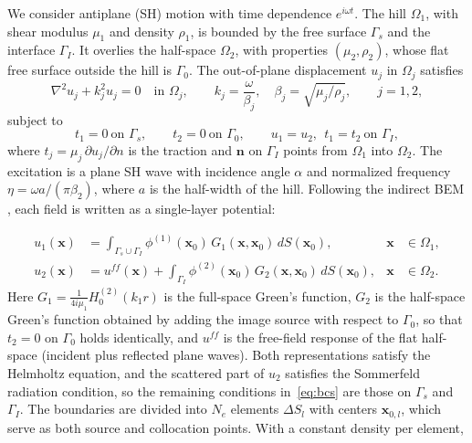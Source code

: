 \documentclass[11pt,twoside]{article}
\begin{document}
We consider antiplane (SH) motion with time dependence $e^{i\omega t}$. The hill
$\Omega_1$, with shear modulus $\mu_1$ and density $\rho_1$, is bounded by the free
surface $\Gamma_s$ and the interface $\Gamma_I$. It overlies the half-space
$\Omega_2$, with properties $(\mu_2,\rho_2)$, whose flat free surface outside the
hill is $\Gamma_0$. The out-of-plane displacement $u_j$ in $\Omega_j$ satisfies
\begin{equation}
  \nabla^2 u_j + k_j^2 u_j = 0 \quad \text{in } \Omega_j,
  \qquad k_j = \frac{\omega}{\beta_j},\quad \beta_j = \sqrt{\mu_j/\rho_j},
  \qquad j = 1,2,
\end{equation}
subject to
\begin{equation}\label{eq:bcs}
  t_1 = 0 \ \text{on } \Gamma_s, \qquad
  t_2 = 0 \ \text{on } \Gamma_0, \qquad
  u_1 = u_2,\ \ t_1 = t_2 \ \text{on } \Gamma_I,
\end{equation}
where $t_j = \mu_j\,\partial u_j/\partial n$ is the traction and $\mathbf{n}$ on
$\Gamma_I$ points from $\Omega_1$ into $\Omega_2$. The excitation is a plane SH
wave with incidence angle $\alpha$ and normalized frequency
$\eta = \omega a/(\pi\beta_2)$, where $a$ is the half-width of the hill. Following the indirect BEM \citep{SanchezSesma1991,wu_novel_2026}, each field
is written as a single-layer potential:

\begin{align}
  u_1(\mathbf{x}) &= \int_{\Gamma_s\cup\Gamma_I}
     \phi^{(1)}(\mathbf{x}_0)\, G_1(\mathbf{x},\mathbf{x}_0)\, dS(\mathbf{x}_0),
     & \mathbf{x}&\in\Omega_1, \label{eq:u1}\\
  u_2(\mathbf{x}) &= u^{f\!f}(\mathbf{x}) + \int_{\Gamma_I}
     \phi^{(2)}(\mathbf{x}_0)\, G_2(\mathbf{x},\mathbf{x}_0)\, dS(\mathbf{x}_0),
     & \mathbf{x}&\in\Omega_2. \label{eq:u2}
\end{align}
Here $G_1 = \frac{1}{4i\mu_1}H_0^{(2)}(k_1 r)$ is the full-space Green's function,
$G_2$ is the half-space Green's function obtained by adding the image source
with respect to $\Gamma_0$, so that $t_2=0$ on $\Gamma_0$ holds identically, and
$u^{f\!f}$ is the free-field response of the flat half-space (incident plus
reflected plane waves). Both representations satisfy the Helmholtz equation, and
the scattered part of $u_2$ satisfies the Sommerfeld radiation condition, so
the remaining conditions in~\eqref{eq:bcs} are those on $\Gamma_s$ and $\Gamma_I$. The boundaries are divided into $N_e$ elements $\Delta S_l$ with centers
$\mathbf{x}_{0,l}$, which serve as both source and collocation points. With a
constant density per element,
\end{document}

